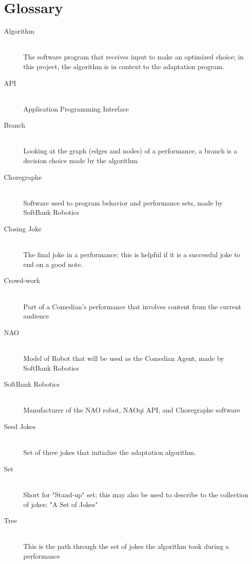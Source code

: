 \documentclass[onecolumn, draftclsnofoot,10pt, compsoc]{IEEEtran}
\begin{document}
\section{Glossary}
\begin{description}
  \item [Algorithm] \hfill \\ The software program that receives input to make an optimized choice; in this project, the algorithm is in context to the adaptation program.
  \item [API] \hfill \\ Application Programming Interface
  \item [Branch] \hfill \\Looking at the graph (edges and nodes) of a performance, a branch is a decision choice made by the algorithm.
  \item [Choregraphe] \hfill \\ Software used to program behavior and performance sets, made by SoftBank Robotics
  \item [Closing Joke] \hfill \\The final joke in a performance; this is helpful if it is a successful joke to end on a good note.
  \item [Crowd-work] \hfill \\ Part of a Comedian's performance that involves content from the current audience
  \item [NAO] \hfill \\ Model of Robot that will be used as the Comedian Agent, made by SoftBank Robotics
  \item [SoftBank Robotics] \hfill \\ Manufacturer of the NAO robot, NAOqi API, and Choregraphe software
  \item [Seed Jokes] \hfill \\ Set of three jokes that initialize the adaptation algorithm.
  \item [Set] \hfill \\Short for "Stand-up" set; this may also be used to describe to the collection of jokes: "A Set of Jokes"
  \item [Tree] \hfill \\This is the path through the set of jokes the algorithm took during a performance

\end{description}



\end{document}
